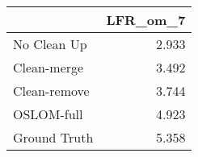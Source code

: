 \begin{tabular}{lr}
\toprule
{} & LFR_om_7 \\
\midrule
No Clean Up  &    2.933 \\
Clean-merge  &    3.492 \\
Clean-remove &    3.744 \\
OSLOM-full   &    4.923 \\
Ground Truth &    5.358 \\
\bottomrule
\end{tabular}
